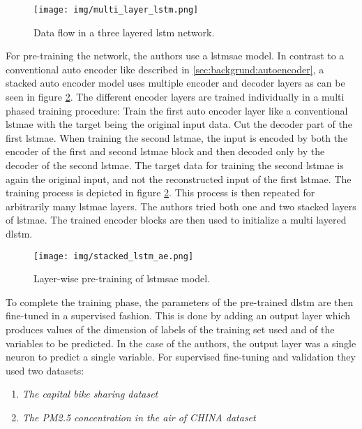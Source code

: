 \begin{figure}[h]
	\centering
	\texttt{[image: img/multi\_layer\_lstm.png]}
	\caption{Data flow in a three layered \gls{lstm} network.}
	\label{fig:stateofart:unsupervised_learning_with_lstms_dlstm}
\end{figure}

For pre-training the network, the authors use a \gls{lstmsae} model. In contrast to a conventional auto encoder like described in \ref{sec:backgrund:autoencoder}, a stacked auto encoder model uses multiple encoder and decoder layers as can be seen in figure \ref{fig:stateofart:unsupervised_learning_dlstm_mts_lstmsae}. The different encoder layers are trained individually in a multi phased training procedure: Train the first auto encoder layer like a conventional \gls{lstmae} with the target being the original input data. Cut the decoder part of the first \gls{lstmae}. When training the second \gls{lstmae}, the input is encoded by both the encoder of the first and second \gls{lstmae} block and then decoded only by the decoder of the second \gls{lstmae}. The target data for training the second \gls{lstmae} is again the original input, and not the reconstructed input of the first \gls{lstmae}. The training process is depicted in figure \ref{fig:stateofart:unsupervised_learning_dlstm_mts_lstmsae}. This process is then repeated for arbitrarily many \gls{lstmae} layers. The authors tried both one and two stacked layers of \gls{lstmae}. The trained encoder blocks are then used to initialize a multi layered \gls{dlstm}.

\begin{figure}[h]
	\centering
	\texttt{[image: img/stacked\_lstm\_ae.png]}
	\caption{Layer-wise pre-training of \gls{lstmsae} model. \cite{unsupervised_learning_lstms_timeseries}}
	\label{fig:stateofart:unsupervised_learning_dlstm_mts_lstmsae}
\end{figure}

To complete the training phase, the parameters of the pre-trained \gls{dlstm} are then fine-tuned in a supervised fashion. This is done by adding an output layer which produces values of the dimension of labels of the training set used and of the variables to be predicted. In the case of the authors, the output layer was a single neuron to predict a single variable. For supervised fine-tuning and validation they used two datasets:

\begin{enumerate}
	\item \textit{The capital bike sharing dataset}
	\item \textit{The PM2.5 concentration in the air of CHINA dataset}
\end{enumerate}

